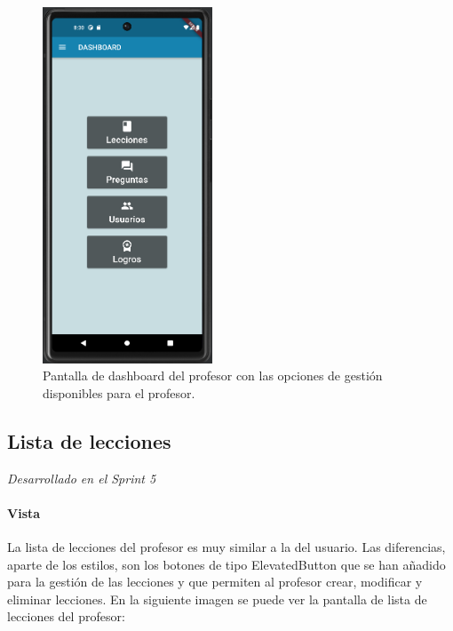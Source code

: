 \begin{figure}[H]
  \centering
  \includegraphics[width=0.45\textwidth]{imagenes/c7/dashboard.png}
  \caption{Pantalla de dashboard del profesor con las opciones de gestión disponibles para el profesor.}
  \label{fig:login}
\end{figure}

\newpage

\subsection{Lista de lecciones} 
\textit{Desarrollado en el Sprint 5}

\paragraph*{Vista}
La lista de lecciones del profesor es muy similar a la del usuario. Las diferencias, aparte de los estilos, son los botones de tipo ElevatedButton que se han añadido para la gestión de las lecciones y que permiten al profesor crear, modificar y eliminar lecciones. En la siguiente imagen se puede ver la pantalla de lista de lecciones del profesor:

